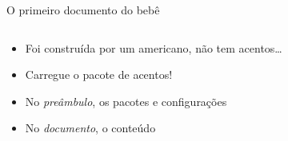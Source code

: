 	\begin{frame}{O primeiro documento do bebê}
        \begin{columns}
            \begin{column}{0.5\textwidth}
                \begin{itemize}[<+->]
                    \item Foi construída por um americano, não tem acentos\dots
                    \item Carregue o pacote de acentos!
                \end{itemize}

                \visible<+->{}

                \begin{itemize}[<+->]
                    \item No \emph{preâmbulo}, os pacotes e configurações
                    \item No \emph{documento}, o conteúdo
                \end{itemize}
            \end{column}
            \begin{column}{0.5\textwidth}
        		{}
            \end{column}
    	\end{columns}
	\end{frame}


